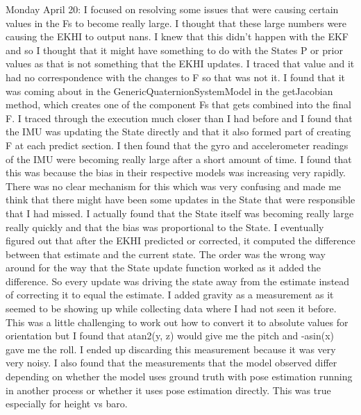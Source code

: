 \documentclass[]{../resources/final_report}
\begin{document}
\begin{appendices}
  Monday April 20: I focused on resolving some issues that were causing certain values in the Fs to become really large. I thought that these large numbers were causing the EKHI to output nans. I knew that this didn’t happen with the EKF and so I thought that it might have something to do with the States P or prior values as that is not something that the EKHI updates. I traced that value and it had no correspondence with the changes to F so that was not it. I found that it was coming about in the GenericQuaternionSystemModel in the getJacobian method, which creates one of the component Fs that gets combined into the final F. I traced through the execution much closer than I had before and I found that the IMU was updating the State directly and that it also formed part of creating F at each predict section. I then found that the gyro and accelerometer readings of the IMU were becoming really large after a short amount of time. I found that this was because the bias in their respective models was increasing very rapidly. There was no clear mechanism for this which was very confusing and made me think that there might have been some updates in the State that were responsible that I had missed. I actually found that the State itself was becoming really large really quickly and that the bias was proportional to the State. I eventually figured out that after the EKHI predicted or corrected, it computed the difference between that estimate and the current state. The order was the wrong way around for the way that the State update function worked as it added the difference. So every update was driving the state away from the estimate instead of correcting it to equal the estimate. I added gravity as a measurement as it seemed to be showing up while collecting data where I had not seen it before. This was a little challenging to work out how to convert it to absolute values for orientation but I found that atan2(y, z) would give me the pitch and -asin(x) gave me the roll. I ended up discarding this measurement because it was very very noisy. I also found that the measurements that the model observed differ depending on whether the model uses ground truth with pose estimation running in another process or whether it uses pose estimation directly. This was true especially for height vs baro.


\end{appendices}
\end{document}
